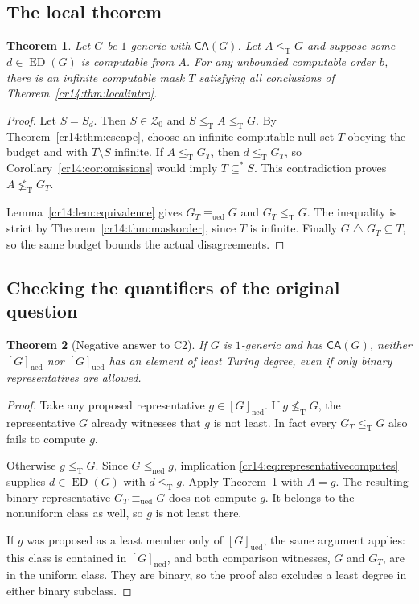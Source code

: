 \documentclass[11pt,a4paper]{article}
\newcommand{\leT}{\leq_{\mathrm T}}
\newcommand{\nleT}{\nleq_{\mathrm T}}
\newcommand{\ned}{\mathrm{ned}}
\newcommand{\ued}{\mathrm{ued}}
\newcommand{\leN}{\leq_{\ned}}
\newcommand{\eqU}{\equiv_{\ued}}
\newcommand{\ED}{\operatorname{ED}}
\newcommand{\Znull}{\mathcal Z_0}
\newcommand{\substar}{\subseteq^{*}}
\newcommand{\symdiff}{\mathbin{\triangle}}
\newcommand{\CA}{\mathsf{CA}}
\newtheorem{theorem}{Theorem}[section]
\theoremstyle{definition}
\theoremstyle{remark}
\begin{document}
\subsection{The local theorem}
\begin{theorem}\label{cr14:thm:local}
Let $G$ be $1$-generic with $\CA(G)$. Let $A\leT G$ and suppose some
$d\in\ED(G)$ is computable from $A$. For any unbounded computable order
$b$, there is an infinite computable mask $T$ satisfying all conclusions of
Theorem~\ref{cr14:thm:localintro}.
\end{theorem}
\begin{proof}
Let $S=S_d$. Then $S\in\Znull$ and $S\leT A\leT G$. By
Theorem~\ref{cr14:thm:escape}, choose an infinite computable null set $T$
obeying the budget and with $T\setminus S$ infinite.
If $A\leT G_T$, then $d\leT G_T$, so
Corollary~\ref{cr14:cor:omissions} would imply $T\substar S$.
This contradiction proves $A\nleT G_T$.

Lemma~\ref{cr14:lem:equivalence} gives $G_T\eqU G$ and $G_T\leT G$.
The inequality is strict by Theorem~\ref{cr14:thm:maskorder}, since $T$ is
infinite. Finally $G\symdiff G_T\subseteq T$, so the same budget bounds
the actual disagreements.
\end{proof}

\subsection{Checking the quantifiers of the original question}
\begin{theorem}[Negative answer to C2]\label{cr14:thm:noleast}
If $G$ is $1$-generic and has $\CA(G)$, neither $[G]_{\ned}$ nor
$[G]_{\ued}$ has an element of least Turing degree, even if only binary
representatives are allowed.
\end{theorem}
\begin{proof}
Take any proposed representative $g\in[G]_{\ned}$.
If $g\nleT G$, the representative $G$ already witnesses that $g$ is not
least. In fact every $G_T\leT G$ also fails to compute $g$.

Otherwise $g\leT G$. Since $G\leN g$, implication
\eqref{cr14:eq:representativecomputes} supplies $d\in\ED(G)$ with $d\leT g$.
Apply Theorem~\ref{cr14:thm:local} with $A=g$. The resulting binary
representative $G_T\eqU G$ does not compute $g$. It belongs to the
nonuniform class as well, so $g$ is not least there.

If $g$ was proposed as a least member only of $[G]_{\ued}$, the same
argument applies: this class is contained in $[G]_{\ned}$, and both
comparison witnesses, $G$ and $G_T$, are in the uniform class. They are
binary, so the proof also excludes a least degree in either binary
subclass.
\end{proof}
\end{document}
